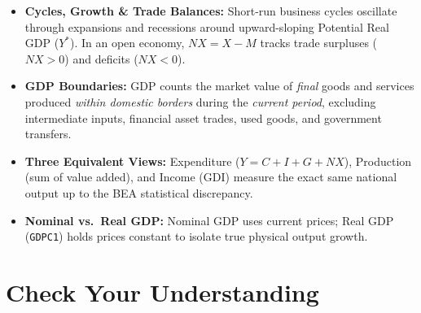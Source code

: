 \documentclass[11pt,letterpaper]{article}
\begin{document}
\begin{takeaways}
\begin{itemize}
    \item \textbf{Cycles, Growth \& Trade Balances:} Short-run business cycles oscillate through expansions and recessions around upward-sloping Potential Real GDP ($Y^*$). In an open economy, $NX = X - M$ tracks trade surpluses ($NX > 0$) and deficits ($NX < 0$).
    \item \textbf{GDP Boundaries:} GDP counts the market value of \emph{final} goods and services produced \emph{within domestic borders} during the \emph{current period}, excluding intermediate inputs, financial asset trades, used goods, and government transfers.
    \item \textbf{Three Equivalent Views:} Expenditure ($Y = C + I + G + NX$), Production (sum of value added), and Income (GDI) measure the exact same national output up to the BEA statistical discrepancy.
    \item \textbf{Nominal vs.\ Real GDP:} Nominal GDP uses current prices; Real GDP (\texttt{GDPC1}) holds prices constant to isolate true physical output growth.
\end{itemize}
\end{takeaways}

\section*{Check Your Understanding}
\end{document}
